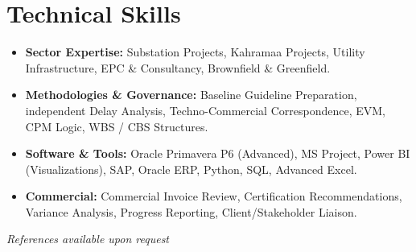 \documentclass[11pt,a4paper]{article}
\begin{document}
\section{Technical Skills}
\begin{itemize}[label={\color{awesome-blue}\small\textbullet}, leftmargin=*, itemsep=0pt, parsep=0pt]
    \raggedright
    \item \textbf{Sector Expertise:} Substation Projects, Kahramaa Projects, Utility Infrastructure, EPC \& Consultancy, Brownfield \& Greenfield.
    \item \textbf{Methodologies \& Governance:} Baseline Guideline Preparation, independent Delay Analysis, Techno-Commercial Correspondence, EVM, CPM Logic, WBS / CBS Structures.
    \item \textbf{Software \& Tools:} Oracle Primavera P6 (Advanced), MS Project, Power BI (Visualizations), SAP, Oracle ERP, Python, SQL, Advanced Excel.
    \item \textbf{Commercial:} Commercial Invoice Review, Certification Recommendations, Variance Analysis, Progress Reporting, Client/Stakeholder Liaison.
\end{itemize}

\vfill
\begin{center}
    \textit{References available upon request}
\end{center}
\end{document}
